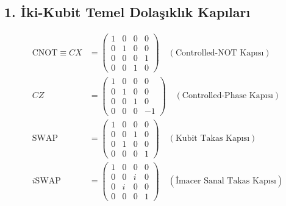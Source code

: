 \documentclass[11pt, a4paper]{article}
\begin{document}
\subsection{1. İki-Kubit Temel Dolaşıklık Kapıları}
\begin{align}
\text{CNOT} \equiv CX &= \begin{pmatrix} 1 & 0 & 0 & 0 \\ 0 & 1 & 0 & 0 \\ 0 & 0 & 0 & 1 \\ 0 & 0 & 1 & 0 \end{pmatrix} \quad (\text{Controlled-NOT Kapısı}) \\
CZ &= \begin{pmatrix} 1 & 0 & 0 & 0 \\ 0 & 1 & 0 & 0 \\ 0 & 0 & 1 & 0 \\ 0 & 0 & 0 & -1 \end{pmatrix} \quad (\text{Controlled-Phase Kapısı}) \\
\text{SWAP} &= \begin{pmatrix} 1 & 0 & 0 & 0 \\ 0 & 0 & 1 & 0 \\ 0 & 1 & 0 & 0 \\ 0 & 0 & 0 & 1 \end{pmatrix} \quad (\text{Kubit Takas Kapısı}) \\
i\text{SWAP} &= \begin{pmatrix} 1 & 0 & 0 & 0 \\ 0 & 0 & i & 0 \\ 0 & i & 0 & 0 \\ 0 & 0 & 0 & 1 \end{pmatrix} \quad (\text{İmacer Sanal Takas Kapısı})
\end{align}
\end{document}
